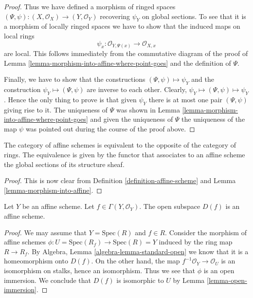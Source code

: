 \begin{proof}
\medskip\noindent
Thus we have defined a morphism of ringed spaces
$(\Psi, \psi) : (X, \mathcal{O}_X) \to (Y, \mathcal{O}_Y)$
recovering $\psi_Y$ on global sections. To see that it is
a morphism of locally ringed spaces we have to show that
the induced maps on local rings
$$
\psi_x : \mathcal{O}_{Y, \Psi(x)} \longrightarrow \mathcal{O}_{X, x}
$$
are local. This follows immediately from the commutative diagram
of the proof of Lemma \ref{lemma-morphism-into-affine-where-point-goes}
and the definition of $\Psi$.

\medskip\noindent
Finally, we have to show that the constructions
$(\Psi, \psi) \mapsto \psi_Y$ and the construction
$\psi_Y \mapsto (\Psi, \psi)$ are inverse to each other.
Clearly, $\psi_Y \mapsto (\Psi, \psi) \mapsto \psi_Y$.
Hence the only thing to prove is that given $\psi_Y$
there is at most one pair $(\Psi, \psi)$ giving rise
to it. The uniqueness of $\Psi$ was shown in Lemma
\ref{lemma-morphism-into-affine-where-point-goes} and
given the uniqueness of $\Psi$ the uniqueness of the
map $\psi$ was pointed out during the course of the proof
above.
\end{proof}

\begin{lemma}
\label{lemma-category-affine-schemes}
The category of affine schemes is equivalent to the opposite of the
category of rings. The equivalence is given by the functor that associates
to an affine scheme the global sections of its structure sheaf.
\end{lemma}

\begin{proof}
This is now clear from Definition \ref{definition-affine-scheme}
and Lemma \ref{lemma-morphism-into-affine}.
\end{proof}

\begin{lemma}
\label{lemma-standard-open-affine}
Let $Y$ be an affine scheme.
Let $f \in \Gamma(Y, \mathcal{O}_Y)$.
The open subspace $D(f)$ is an affine scheme.
\end{lemma}

\begin{proof}
We may assume that $Y = \text{Spec}(R)$ and $f \in R$.
Consider the morphism of affine schemes
$\phi : U = \text{Spec}(R_f) \to \text{Spec}(R) = Y$ induced by the ring
map $R \to R_f$. By Algebra, Lemma \ref{algebra-lemma-standard-open}
we know that it is a homeomorphism onto $D(f)$.
On the other hand, the map $f^{-1}\mathcal{O}_Y \to \mathcal{O}_U$
is an isomorphism on stalks, hence an isomorphism. Thus we see
that $\phi$ is an open immersion. We conclude that $D(f)$
is isomorphic to $U$ by Lemma \ref{lemma-open-immersion}.
\end{proof}

